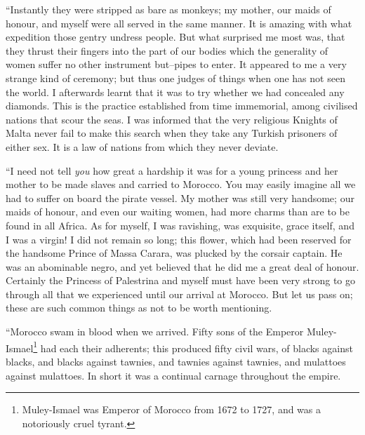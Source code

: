 ``Instantly they were stripped as bare as monkeys; my mother, our maids of honour, and myself were all served in the same manner. It is amazing with what expedition those gentry undress people. But what surprised me most was, that they thrust their fingers into the part of our bodies which the generality of women suffer no other instrument but--pipes to enter. It appeared to me a very strange kind of ceremony; but thus one judges of things when one has not seen the world. I afterwards learnt that it was to try whether we had concealed any diamonds. This is the practice established from time immemorial, among civilised nations that scour the seas. I was informed that the very religious Knights of Malta never fail to make this search when they take any Turkish prisoners of either sex. It is a law of nations from which they never deviate.

``I need not tell \textit{you} how great a hardship it was for a young princess and her mother to be made slaves and carried to Morocco. You may easily imagine all we had to suffer on board the pirate vessel. My mother was still very handsome; our maids of honour, and even our waiting women, had more charms than are to be found in all Africa. As for myself, I was ravishing, was exquisite, grace itself, and I was a virgin! I did not remain so long; this flower, which had been reserved for the handsome Prince of Massa Carara, was plucked by the corsair captain. He was an abominable negro, and yet believed that he did me a great deal of honour. Certainly the Princess of Palestrina and myself must have been very strong to go through all that we experienced until our arrival at Morocco. But let us pass on; these are such common things as not to be worth mentioning.

``Morocco swam in blood when we arrived. Fifty sons of the Emperor Muley-Ismael\footnote{Muley-Ismael was Emperor of Morocco from 1672 to 1727, and was a notoriously cruel tyrant.} had each their adherents; this produced fifty civil wars, of blacks against blacks, and blacks against tawnies, and tawnies against tawnies, and mulattoes against mulattoes. In short it was a continual carnage throughout the empire.

